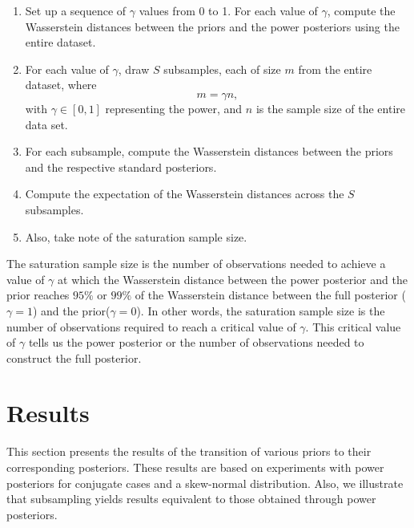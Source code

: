 \documentclass[12pt]{article}
\begin{document}
\begin{enumerate}
	\item Set up a sequence of $\gamma$ values from 0 to 1. For each value of $\gamma$, compute the Wasserstein distances between the priors and the power posteriors using the entire dataset. 
	\item For each value of $\gamma$, draw $S$ subsamples, each of size $m$ from the entire dataset, where \[m=\gamma n,\] with $\gamma \in [0, 1]$ representing the power, and $n$ is the sample size of the entire data set.
	\item For each subsample, compute the Wasserstein distances between the priors and the respective standard posteriors.
	\item Compute the expectation of the Wasserstein distances across the $S$ subsamples.
	\item Also, take note of the saturation sample size.
\end{enumerate}
	The saturation sample size is the number of observations needed to achieve a value of $\gamma$ at which the Wasserstein distance between the power posterior and the prior reaches $95\%$ or $99\%$ of the Wasserstein distance between the full posterior ($\gamma=1$) and the prior($\gamma=0$). In other words, the saturation sample size is the number of observations required to reach a critical value of $\gamma$. This critical value of $\gamma$ tells us the power posterior or the number of observations needed to construct the full posterior.



\section{Results}
This section presents the results of the transition of various priors to their corresponding posteriors. These results are based on experiments with power posteriors for conjugate cases and a skew-normal distribution. Also, we illustrate that subsampling yields results equivalent to those obtained through power posteriors.
\end{document}
